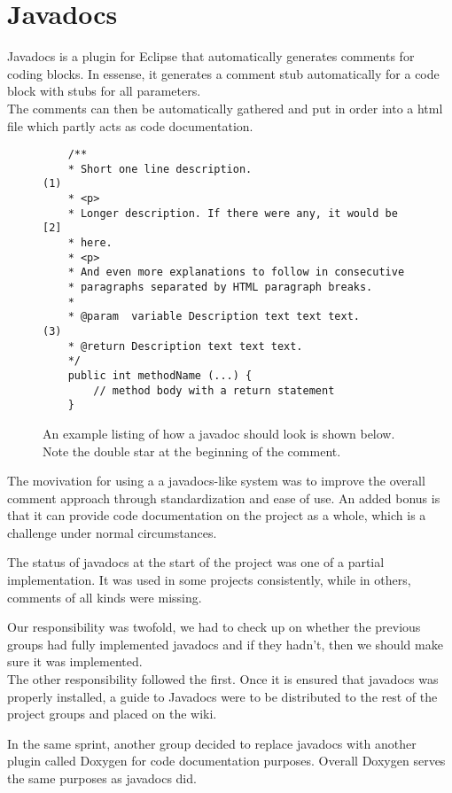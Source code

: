 \section{Javadocs} \label{Sprint1_SecJavadocs}
Javadocs is a plugin for Eclipse that automatically generates comments for coding blocks. In essense, it generates a comment stub automatically for a code block with stubs for all parameters.\\
The comments can then be automatically gathered and put in order into a html file which partly acts as code documentation.\\
\begin{figure}[H]
	\begin{lstlisting}
	/**
	* Short one line description.                           (1)
	* <p>
	* Longer description. If there were any, it would be    [2]
	* here.
	* <p>
	* And even more explanations to follow in consecutive
	* paragraphs separated by HTML paragraph breaks.
	*
	* @param  variable Description text text text.          (3)
	* @return Description text text text.
	*/
	public int methodName (...) {
		// method body with a return statement
	}
	\end{lstlisting}
	\caption{An example listing of how a javadoc should look is shown below. Note the double star at the beginning of the comment.}
	\label{javadocsExample}
\end{figure}

The movivation for using a a javadocs-like system was to improve the overall comment approach through standardization and ease of use. An added bonus is that it can provide code documentation on the project as a whole, which is a challenge under normal circumstances.

The status of javadocs at the start of the project was one of a partial implementation. It was used in some projects consistently, while in others, comments of all kinds were missing.

Our responsibility was twofold, we had to check up on whether the previous groups had fully implemented javadocs and if they hadn't, then we should make sure it was implemented.\\
The other responsibility followed the first. Once it is ensured that javadocs was properly installed, a guide to Javadocs were to be distributed to the rest of the project groups and placed on the wiki.

In the same sprint, another group decided to replace javadocs with another plugin called Doxygen for code documentation purposes. Overall Doxygen serves the same purposes as javadocs did.